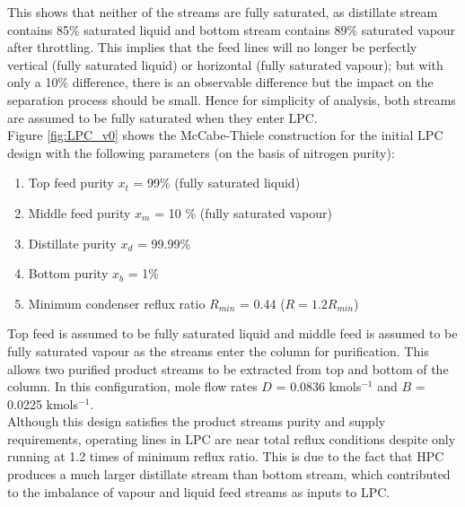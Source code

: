        \noindent This shows that neither of the streams are fully saturated, as distillate stream contains 85\% saturated liquid and bottom stream contains 89\% saturated vapour after throttling. This implies that the feed lines will no longer be perfectly vertical (fully saturated liquid) or horizontal (fully saturated vapour); but with only a 10\% difference, there is an observable difference but the impact on the separation process should be small. Hence for simplicity of analysis, both streams are assumed to be fully saturated when they enter LPC.\\
        
        Figure \ref{fig:LPC_v0} shows the McCabe-Thiele construction for the initial LPC design with the following parameters (on the basis of nitrogen purity):
        \begin{enumerate}
            \item Top feed purity $x_t$ = 99\% (fully saturated liquid)
            \item Middle feed purity $x_m$ = 10 \% (fully saturated vapour)
            \item Distillate purity $x_d$ = 99.99\%
            \item Bottom purity $x_b$ = 1\%
            \item Minimum condenser reflux ratio $R_{min}$ = 0.44 ($R = 1.2R_{min}$)
        \end{enumerate}
        Top feed is assumed to be fully saturated liquid and middle feed is assumed to be fully saturated vapour as the streams enter the column for purification. This allows two purified product streams to be extracted from top and bottom of the column. In this configuration, mole flow rates $D$ = 0.0836 kmols$^{-1}$ and $B$ = 0.0225 kmols$^{-1}$. \\
        Although this design satisfies the product streams purity and supply requirements,  operating lines in LPC are near total reflux conditions despite only running at 1.2 times of minimum reflux ratio. This is due to the fact that HPC produces a much larger distillate stream than bottom stream, which contributed to the imbalance of vapour and liquid feed streams as inputs to LPC. \\
        
